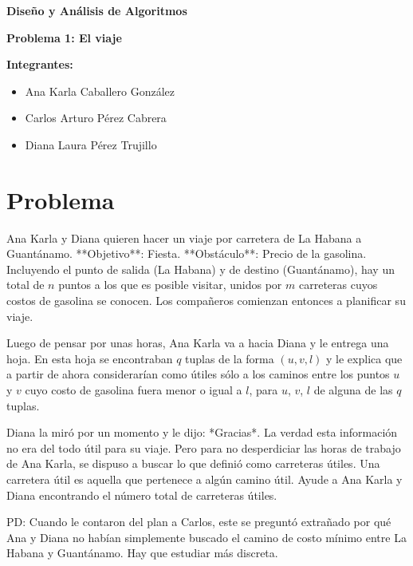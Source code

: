 \documentclass{article}
\begin{document}
\begin{titlepage}
    \centering
{\bfseries\Huge Diseño y Análisis de Algoritmos \par}
\vspace{2cm}
{\bfseries\Large Problema 1: El viaje}
\vspace{2cm}

{\bfseries\Large Integrantes:}
\begin{center}
    \begin{itemize}
        \item Ana Karla Caballero González
        \item Carlos Arturo Pérez Cabrera
        \item Diana Laura Pérez Trujillo
    \end{itemize}
\end{center}


\end{titlepage}

\section{Problema}
Ana Karla y Diana quieren hacer un viaje por carretera de La Habana a Guantánamo.  
**Objetivo**: Fiesta.  
**Obstáculo**: Precio de la gasolina. Incluyendo el punto de salida (La Habana) y de destino (Guantánamo), hay un total de $n$ puntos a los que es posible visitar, unidos por $m$ carreteras cuyos costos de gasolina se conocen.  
Los compañeros comienzan entonces a planificar su viaje.

Luego de pensar por unas horas, Ana Karla va a hacia Diana y le entrega una hoja. En esta hoja se encontraban $q$ tuplas de la forma $(u, v, l)$ y le explica que a partir de ahora considerarían como útiles sólo a los caminos entre los puntos $u$ y $v$ cuyo costo de gasolina fuera menor o igual a $l$, para $u$, $v$, $l$ de alguna de las $q$ tuplas.

Diana la miró por un momento y le dijo: *Gracias*. La verdad esta información no era del todo útil para su viaje. Pero para no desperdiciar las horas de trabajo de Ana Karla, se dispuso a buscar lo que definió como carreteras útiles. Una carretera útil es aquella que pertenece a algún camino útil.  
Ayude a Ana Karla y Diana encontrando el número total de carreteras útiles.

PD: Cuando le contaron del plan a Carlos, este se preguntó extrañado por qué Ana y Diana  
no habían simplemente buscado el camino de costo mínimo entre La Habana y Guantánamo.  
Hay que estudiar más discreta.
\end{document}
